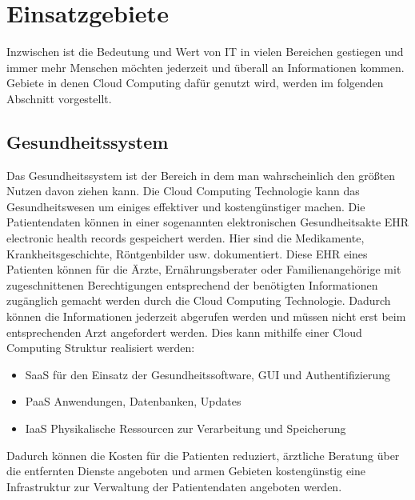 \section{Einsatzgebiete}
Inzwischen ist die Bedeutung und Wert von IT in vielen Bereichen gestiegen und immer mehr Menschen möchten jederzeit und überall an Informationen kommen. Gebiete in denen Cloud Computing dafür genutzt wird, werden im folgenden Abschnitt vorgestellt.

\subsection{Gesundheitssystem}
Das Gesundheitssystem ist der Bereich in dem man wahrscheinlich den größten Nutzen davon ziehen kann. Die Cloud Computing Technologie kann das Gesundheitswesen um einiges effektiver und kostengünstiger machen. Die Patientendaten können in einer sogenannten elektronischen Gesundheitsakte EHR \glqq electronic health records\grqq{} gespeichert werden\cite{e-Health}. Hier sind die Medikamente, Krankheitsgeschichte, Röntgenbilder usw. dokumentiert. Diese EHR eines Patienten können für die Ärzte, Ernährungsberater oder Familienangehörige mit zugeschnittenen Berechtigungen entsprechend der benötigten Informationen zugänglich gemacht werden durch die Cloud Computing Technologie\cite{health}. Dadurch können die Informationen jederzeit abgerufen werden und müssen nicht erst beim entsprechenden Arzt angefordert werden. Dies kann mithilfe einer Cloud Computing Struktur realisiert werden:
\begin{itemize}
	\item SaaS für den Einsatz der Gesundheitssoftware, GUI und Authentifizierung
	\item PaaS Anwendungen, Datenbanken, Updates
	\item IaaS Physikalische Ressourcen zur Verarbeitung und Speicherung
\end{itemize} 

Dadurch können die Kosten für die Patienten reduziert, ärztliche Beratung über die entfernten Dienste angeboten und armen Gebieten kostengünstig eine Infrastruktur zur Verwaltung der Patientendaten angeboten werden\cite{recenttrends}.

